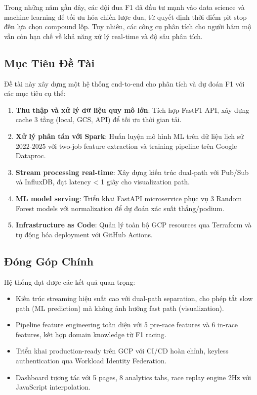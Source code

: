 \documentclass[conference,10pt]{IEEEtran}
\begin{document}
Trong những năm gần đây, các đội đua F1 đã đầu tư mạnh vào data science và machine learning để tối ưu hóa chiến lược đua, từ quyết định thời điểm pit stop đến lựa chọn compound lốp. Tuy nhiên, các công cụ phân tích cho người hâm mộ vẫn còn hạn chế về khả năng xử lý real-time và độ sâu phân tích.

\subsection{Mục Tiêu Đề Tài}
Đề tài này xây dựng một hệ thống end-to-end cho phân tích và dự đoán F1 với các mục tiêu cụ thể:

\begin{enumerate}
    \item \textbf{Thu thập và xử lý dữ liệu quy mô lớn}: Tích hợp FastF1 API, xây dựng cache 3 tầng (local, GCS, API) để tối ưu thời gian tải.
    \item \textbf{Xử lý phân tán với Spark}: Huấn luyện mô hình ML trên dữ liệu lịch sử 2022-2025 với two-job feature extraction và training pipeline trên Google Dataproc.
    \item \textbf{Stream processing real-time}: Xây dựng kiến trúc dual-path với Pub/Sub và InfluxDB, đạt latency < 1 giây cho visualization path.
    \item \textbf{ML model serving}: Triển khai FastAPI microservice phục vụ 3 Random Forest models với normalization để dự đoán xác suất thắng/podium.
    \item \textbf{Infrastructure as Code}: Quản lý toàn bộ GCP resources qua Terraform và tự động hóa deployment với GitHub Actions.
\end{enumerate}

\subsection{Đóng Góp Chính}
Hệ thống đạt được các kết quả quan trọng:
\begin{itemize}
    \item Kiến trúc streaming hiệu suất cao với dual-path separation, cho phép tắt slow path (ML prediction) mà không ảnh hưởng fast path (visualization).
    \item Pipeline feature engineering toàn diện với 5 pre-race features và 6 in-race features, kết hợp domain knowledge từ F1 racing.
    \item Triển khai production-ready trên GCP với CI/CD hoàn chỉnh, keyless authentication qua Workload Identity Federation.
    \item Dashboard tương tác với 5 pages, 8 analytics tabs, race replay engine 2Hz với JavaScript interpolation.
\end{itemize}
\end{document}
